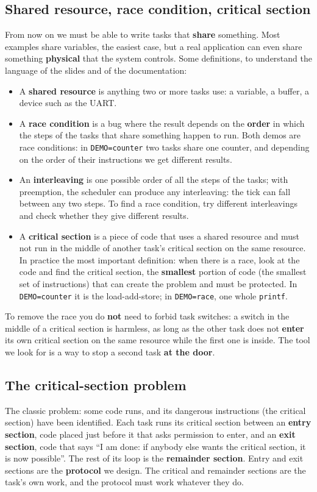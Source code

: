 \subsection{Shared resource, race condition, critical section}
From now on we must be able to write tasks that \textbf{share} something. Most examples share variables, the easiest case, but a real application can even share something \textbf{physical} that the system controls. Some definitions, to understand the language of the slides and of the documentation:
\begin{itemize}
    \item A \textbf{shared resource} is anything two or more tasks use: a variable, a buffer, a device such as the UART.
    \item A \textbf{race condition} is a bug where the result depends on the \textbf{order} in which the steps of the tasks that share something happen to run. Both demos are race conditions: in \texttt{DEMO=counter} two tasks share one counter, and depending on the order of their instructions we get different results.
    \item An \textbf{interleaving} is one possible order of all the steps of the tasks; with preemption, the scheduler can produce any interleaving: the tick can fall between any two steps. To find a race condition, try different interleavings and check whether they give different results.
    \item A \textbf{critical section} is a piece of code that uses a shared resource and must not run in the middle of another task's critical section on the same resource. In practice the most important definition: when there is a race, look at the code and find the critical section, the \textbf{smallest} portion of code (the smallest set of instructions) that can create the problem and must be protected. In \texttt{DEMO=counter} it is the load-add-store; in \texttt{DEMO=race}, one whole \texttt{printf}.
\end{itemize}
To remove the race you do \textbf{not} need to forbid task switches: a switch in the middle of a critical section is harmless, as long as the other task does not \textbf{enter} its own critical section on the same resource while the first one is inside. The tool we look for is a way to stop a second task \textbf{at the door}.

\subsection{The critical-section problem}
The classic problem: some code runs, and its dangerous instructions (the critical section) have been identified. Each task runs its critical section between an \textbf{entry section}, code placed just before it that asks permission to enter, and an \textbf{exit section}, code that says ``I am done: if anybody else wants the critical section, it is now possible''. The rest of its loop is the \textbf{remainder section}. Entry and exit sections are the \textbf{protocol} we design. The critical and remainder sections are the task's own work, and the protocol must work whatever they do.

